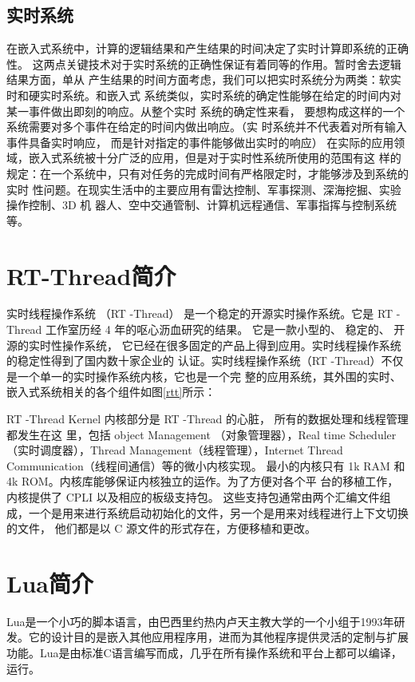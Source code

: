 \subsection{实时系统}
在嵌入式系统中，计算的逻辑结果和产生结果的时间决定了实时计算即系统的正确性。
这两点关键技术对于实时系统的正确性保证有着同等的作用。暂时舍去逻辑结果方面，单从
产生结果的时间方面考虑，我们可以把实时系统分为两类：软实时和硬实时系统。和嵌入式
系统类似，实时系统的确定性能够在给定的时间内对某一事件做出即刻的响应。从整个实时
系统的确定性来看， 要想构成这样的一个系统需要对多个事件在给定的时间内做出响应。（实
时系统并不代表着对所有输入事件具备实时响应， 而是针对指定的事件能够做出实时的响应）
在实际的应用领域，嵌入式系统被十分广泛的应用，但是对于实时性系统所使用的范围有这
样的规定：在一个系统中，只有对任务的完成时间有严格限定时，才能够涉及到系统的实时
性问题。在现实生活中的主要应用有雷达控制、军事探测、深海挖掘、实验操作控制、3D 机
器人、空中交通管制、计算机远程通信、军事指挥与控制系统等。

\section{RT-Thread简介}
实时线程操作系统 （RT -Thread）
是一个稳定的开源实时操作系统。它是 RT -Thread
工作室历经 4 年的呕心沥血研究的结果。 它是一款小型的、 稳定的、 开源的实时性操作系统，
它已经在很多固定的产品上得到应用。实时线程操作系统的稳定性得到了国内数十家企业的
认证。实时线程操作系统（RT -Thread）不仅是一个单一的实时操作系统内核，它也是一个完
整的应用系统，其外围的实时、嵌入式系统相关的各个组件如图\ref{rtt}所示：

RT -Thread Kernel 内核部分是 RT -Thread 的心脏， 所有的数据处理和线程管理都发生在这
里，包括 object  Management （对象管理器），Real  time  Scheduler（实时调度器），Thread
Management（线程管理），Internet Thread Communication（线程间通信）等的微小内核实现。
最小的内核只有 1k  RAM 和 4k  ROM。内核库能够保证内核独立的运作。为了方便对各个平
台的移植工作， 内核提供了 CPLI 以及相应的板级支持包。 这些支持包通常由两个汇编文件组
成，一个是用来进行系统启动初始化的文件，另一个是用来对线程进行上下文切换的文件，
他们都是以 C 源文件的形式存在，方便移植和更改。

\section{Lua简介}

Lua是一个小巧的脚本语言，由巴西里约热内卢天主教大学的一个小组于1993年研发。它的设计目的是嵌入其他应用程序用，进而为其他程序提供灵活的定制与扩展功能。Lua是由标准C语言编写而成，几乎在所有操作系统和平台上都可以编译，运行。

